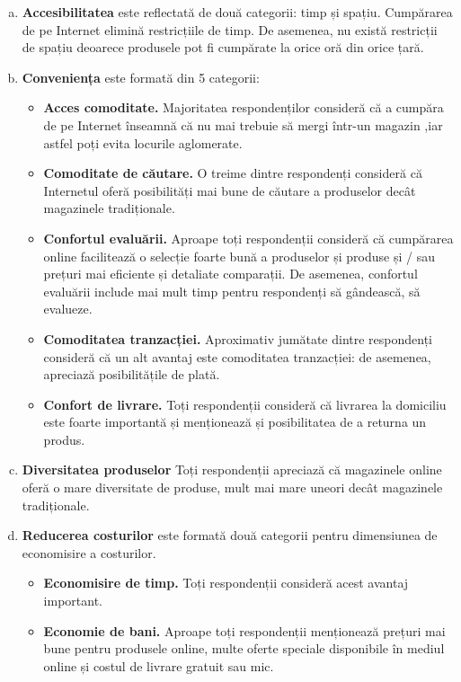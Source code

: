 \documentclass[a4paper, 12pt]{article}
\begin{document}
	\begin{enumerate}[a.]
		
\newpage		
	\item\textbf {Accesibilitatea} este reflectată de două categorii: timp și spațiu. Cumpărarea de pe Internet elimină restricțiile de timp. De asemenea, nu există restricții de spațiu deoarece produsele pot fi cumpărate la orice oră din orice țară.
	\item\textbf{Conveniența} este formată din 5 categorii:  

	\begin{itemize}
			\item\textbf{ Acces comoditate.} Majoritatea respondenților consideră că a cumpăra de pe Internet înseamnă că nu mai trebuie să mergi într-un magazin ,iar astfel poți evita locurile aglomerate.
		\item\textbf{Comoditate de căutare.} O treime dintre respondenți consideră că Internetul oferă posibilități mai bune de căutare a produselor decât magazinele tradiționale.
		\item\textbf{Confortul evaluării.} Aproape toți respondenții consideră că cumpărarea online facilitează o selecție foarte bună a produselor și produse și / sau prețuri mai eficiente și detaliate comparații. De asemenea, confortul evaluării include mai mult timp pentru respondenți să gândească, să evalueze.
		\item\textbf{Comoditatea tranzacției.} Aproximativ jumătate dintre respondenți consideră că un alt avantaj este comoditatea tranzacției: de asemenea, apreciază posibilitățile de plată.	
		\item\textbf{Confort de livrare.} Toți respondenții consideră că livrarea la domiciliu este foarte importantă și menționează și posibilitatea de a returna un produs.
	\end{itemize}
		\item\textbf{Diversitatea produselor} Toți respondenții apreciază că magazinele online oferă o mare diversitate de produse, mult mai mare uneori decât magazinele tradiționale.
		\item\textbf{Reducerea costurilor} este formată două categorii pentru dimensiunea de economisire a costurilor.
	\begin{itemize}
		\item\textbf{Economisire de timp.} Toți respondenții consideră acest avantaj important. \item\textbf{Economie de bani.} Aproape toți respondenții menționează prețuri mai bune pentru produsele online, multe oferte speciale disponibile în mediul online și costul de livrare gratuit sau mic.

\end{itemize}
\end{enumerate}
\end{document}

